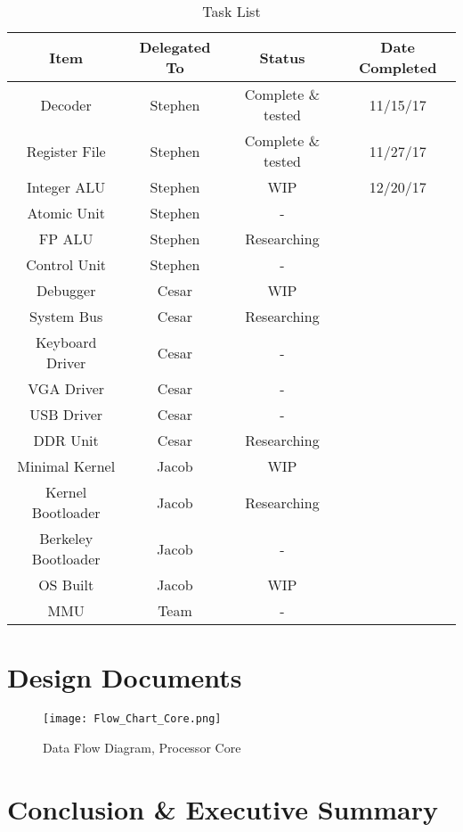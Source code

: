 \documentclass{article}
\begin{document}
\begin{table}[ht]
\centering
\caption{Task List}
\label{my-label}
\begin{tabular}{|c|c|c|c|}
\hline
\textbf{Item}       & \textbf{Delegated To} & \textbf{Status}    & \textbf{Date Completed} \\ \hline
Decoder             & Stephen               & Complete \& tested & 11/15/17                \\ \hline
Register File       & Stephen               & Complete \& tested & 11/27/17                \\ \hline
Integer ALU         & Stephen               & WIP                & 12/20/17                \\ \hline
Atomic Unit         & Stephen               & -                  &                         \\ \hline
FP ALU              & Stephen               & Researching        &                         \\ \hline
Control Unit        & Stephen               & -                  &                         \\ \hline
Debugger            & Cesar                 & WIP                &                         \\ \hline
System Bus          & Cesar                 & Researching        &                         \\ \hline
Keyboard Driver     & Cesar                 & -                  &                         \\ \hline
VGA Driver          & Cesar                 & -                  &                         \\ \hline
USB Driver          & Cesar                 & -                  &                         \\ \hline
DDR Unit            & Cesar                 & Researching        &                         \\ \hline
Minimal Kernel      & Jacob                 & WIP                &                         \\ \hline
Kernel Bootloader   & Jacob                 & Researching        &                         \\ \hline
Berkeley Bootloader & Jacob                 & -                  &                         \\ \hline
OS Built            & Jacob                 & WIP                &                         \\ \hline
MMU                 & Team                  & -                  &                         \\ \hline
\end{tabular}
\end{table}

\section{Design Documents}
\begin{figure}[ht]
\caption{Data Flow Diagram, Processor Core}
\label{flow}
\centering
\texttt{[image: Flow\_Chart\_Core.png]}
\end{figure}

\section{Conclusion \& Executive Summary}

\printbibliography
\end{document}

